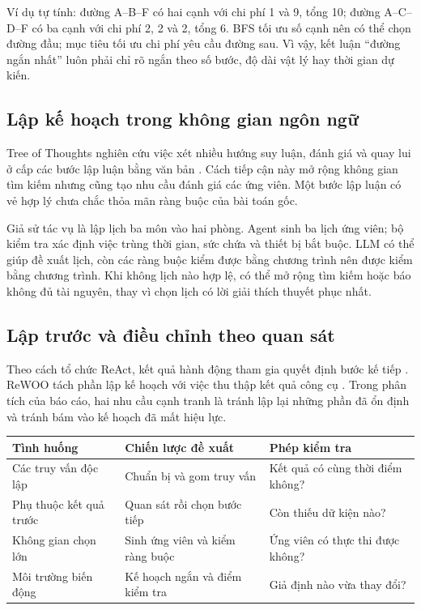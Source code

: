 Ví dụ tự tính: đường A--B--F có hai cạnh với chi phí 1 và 9, tổng 10; đường A--C--D--F
có ba cạnh với chi phí 2, 2 và 2, tổng 6. BFS tối ưu số cạnh nên có thể chọn đường đầu;
mục tiêu tối ưu chi phí yêu cầu đường sau. Vì vậy, kết luận ``đường ngắn nhất'' luôn
phải chỉ rõ ngắn theo số bước, độ dài vật lý hay thời gian dự kiến.

\subsection{Lập kế hoạch trong không gian ngôn ngữ}
Tree of Thoughts nghiên cứu việc xét nhiều hướng suy luận, đánh giá và quay lui ở
cấp các bước lập luận bằng văn bản \cite{tot}. Cách tiếp cận này mở rộng không gian
tìm kiếm nhưng cũng tạo nhu cầu đánh giá các ứng viên. Một bước lập luận có vẻ hợp
lý chưa chắc thỏa mãn ràng buộc của bài toán gốc.

Giả sử tác vụ là lập lịch ba môn vào hai phòng. Agent sinh ba lịch ứng viên; bộ kiểm
tra xác định việc trùng thời gian, sức chứa và thiết bị bắt buộc. LLM có thể giúp đề
xuất lịch, còn các ràng buộc kiểm được bằng chương trình nên được kiểm bằng chương
trình. Khi không lịch nào hợp lệ, có thể mở rộng tìm kiếm hoặc báo không đủ tài nguyên,
thay vì chọn lịch có lời giải thích thuyết phục nhất.

\subsection{Lập trước và điều chỉnh theo quan sát}
Theo cách tổ chức ReAct, kết quả hành động tham gia quyết định bước kế tiếp
\cite{react}. ReWOO tách phần lập kế hoạch với việc thu thập kết quả công cụ
\cite{rewoo}. Trong phân tích của báo cáo, hai nhu cầu cạnh tranh là tránh lập lại
những phần đã ổn định và tránh bám vào kế hoạch đã mất hiệu lực.

\begin{center}\small
\begin{tabularx}{\linewidth}{@{}p{3.0cm}XX@{}}\toprule
\textbf{Tình huống} & \textbf{Chiến lược đề xuất} & \textbf{Phép kiểm tra}\\\midrule
Các truy vấn độc lập & Chuẩn bị và gom truy vấn & Kết quả có cùng thời điểm không?\\
Phụ thuộc kết quả trước & Quan sát rồi chọn bước tiếp & Còn thiếu dữ kiện nào?\\
Không gian chọn lớn & Sinh ứng viên và kiểm ràng buộc & Ứng viên có thực thi được không?\\
Môi trường biến động & Kế hoạch ngắn và điểm kiểm tra & Giả định nào vừa thay đổi?\\\bottomrule
\end{tabularx}\end{center}

